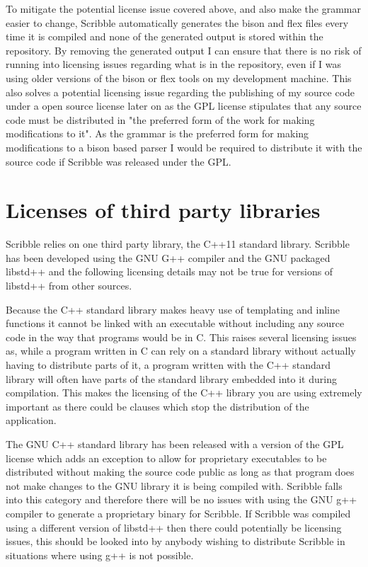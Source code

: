 \documentclass[]{final_report}
\begin{document}
To mitigate the potential license issue covered above, and also make the grammar easier to change, Scribble automatically generates the bison and flex files every time it is compiled and none of the generated output is stored within the repository. By removing the generated output I can ensure that there is no risk of running into licensing issues regarding what is in the repository, even if I was using older versions of the bison or flex tools on my development machine. This also solves a potential licensing issue regarding the publishing of my source code under a open source license later on as the GPL license stipulates that any source code must be distributed in "the preferred form of the work for making modifications to it". As the grammar is the preferred form for making modifications to a bison based parser I would be required to distribute it with the source code if Scribble was released under the GPL.

\section{Licenses of third party libraries}

Scribble relies on one third party library, the C++11 standard library. Scribble has been developed using the GNU G++ compiler and the GNU packaged libstd++ and the following licensing details may not be true for  versions of libstd++ from other sources.

Because the C++ standard library makes heavy use of templating and inline functions it cannot be linked with an executable without including any source code in the way that programs would be in C. This raises several licensing issues as, while a program written in C can rely on a standard library without actually having to distribute parts of it, a program written with the C++ standard library will often have parts of the standard library embedded into it during compilation. This makes the licensing of the C++ library you are using extremely important as there could be clauses which stop the distribution of the application.

The GNU C++ standard library has been released with a version of the GPL license which adds an exception to allow for proprietary executables to be distributed without making the source code public as long as that program does not make changes to the GNU library it is being compiled with. Scribble falls into this category and therefore there will be no issues with using the GNU g++ compiler to generate a proprietary binary for Scribble. If Scribble was compiled using a different version of libstd++ then there could potentially be licensing issues, this should be looked into by anybody wishing to distribute Scribble in situations where using g++ is not possible.
\end{document}

